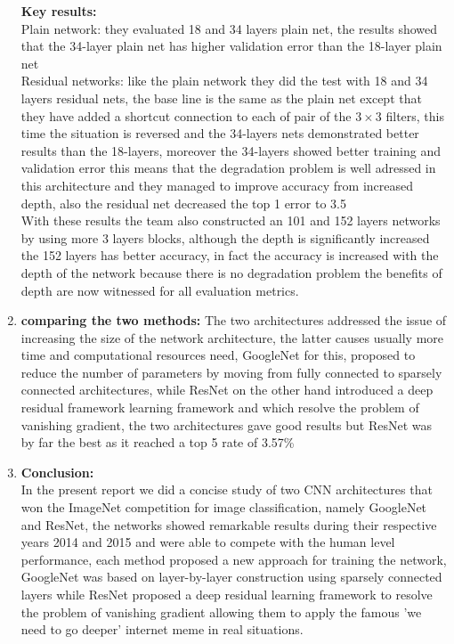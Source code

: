\documentclass[12pt,a4paper]{report}
\begin{document}
\begin{enumerate}
\textbf{Key results:}\\
Plain 	network: they evaluated 18 and 34 layers plain net, the results showed that the 34-layer plain net has higher validation error than the 18-layer plain net\\
Residual networks: like the plain network they did the test with 18 and 34 layers residual nets, the base line is the same as the plain net except that they have added a shortcut connection to each of pair of the $3 \times 3$ filters, this time the situation is reversed and the 34-layers nets demonstrated better results than the 18-layers, moreover the 34-layers showed better training and validation error this means that the degradation problem is well adressed in this architecture and they managed to improve accuracy from increased depth, also the residual net decreased the top 1 error to 3.5 \\
With these results the team also constructed an 101 and 152 layers networks by using more 3 layers blocks, although the depth is significantly increased the 152 layers has better accuracy, in fact the accuracy is increased with the depth of the network because there is no degradation problem the benefits of depth are now witnessed for all evaluation metrics.

\item \textbf{comparing the two methods:}
The two architectures addressed the issue of increasing the size of the network architecture, the latter causes usually more time and computational  resources need, GoogleNet for this, proposed to reduce the number of parameters by moving from fully connected to sparsely connected architectures, while ResNet on the other hand introduced a deep residual framework learning framework and which resolve the problem of vanishing gradient, the two architectures gave good results but ResNet was by far the best as it reached a top 5 rate of 3.57\%

\item \textbf{Conclusion:}\\
In the present report we did a concise study of two CNN architectures that won the ImageNet competition for image classification, namely GoogleNet and ResNet, the networks showed remarkable results during their respective years 2014 and 2015 and were able to compete with the human level performance, each method proposed a new approach for training the network, GoogleNet was based on layer-by-layer construction using sparsely connected layers while ResNet proposed a deep residual learning framework to resolve the problem of vanishing gradient allowing them to apply the famous 'we need to go deeper' internet meme in real situations.
  

 














\end{enumerate}
\end{document}
